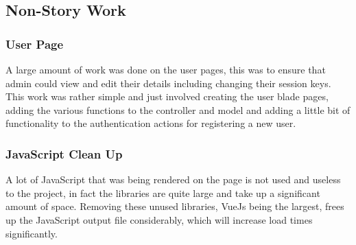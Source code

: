 \subsection{Non-Story Work}
\subsubsection{User Page}
A large amount of work was done on the user pages, this was to ensure that admin could view and edit their details including changing their session keys. This work was rather simple and just involved creating the user blade pages, adding the various functions to the controller and model and adding a little bit of functionality to the authentication actions for registering a new user.
\subsubsection{JavaScript Clean Up}
A lot of JavaScript that was being rendered on the page is not used and useless to the project, in fact the libraries are quite large and take up a significant amount of space. Removing these unused libraries, VueJs being the largest, frees up the JavaScript output file considerably, which will increase load times significantly.
\newpage

